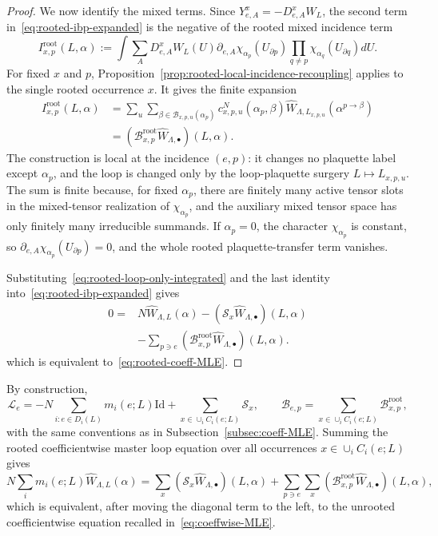 \documentclass[11pt,a4paper,reqno]{amsart}
\theoremstyle{definition}
\theoremstyle{remark}
\newcommand\Id{{\mathrm{Id}}}
\begin{document}
\begin{proof}
We now identify the mixed terms.  Since $Y^x_{e,A}=-D^x_{e,A}W_L$, the second term in~\eqref{eq:rooted-ibp-expanded} is the negative of the rooted mixed incidence term
\[
I^{\mathrm{root}}_{x,p}(L,\alpha)
:=
\int
\sum_A
D^x_{e,A}W_L(U) 
\partial_{e,A}\chi_{\alpha_p}(U_{\partial p})
\prod_{q\neq p}\chi_{\alpha_q}(U_{\partial q}) dU.
\]
For fixed $x$ and $p$, Proposition~\ref{prop:rooted-local-incidence-recoupling} applies to the single rooted occurrence $x$.  It gives the finite expansion
\begin{align*}
I^{\mathrm{root}}_{x,p}(L,\alpha)
&=
\sum_u\sum_{\beta\in\mathcal B_{x,p,u}(\alpha_p)}
c^N_{x,p,u}(\alpha_p,\beta)
\widehat W_{\Lambda,L_{x,p,u}}(\alpha^{p\to\beta})\\
&=(\mathscr B^{\mathrm{root}}_{x,p}\widehat W_{\Lambda,\bullet})(L,\alpha).
\end{align*}
The construction is local at the incidence $(e,p)$: it changes no plaquette label except $\alpha_p$, and the loop is changed only by the loop-plaquette surgery $L\mapsto L_{x,p,u}$.  The sum is finite because, for fixed $\alpha_p$, there are finitely many active tensor slots in the mixed-tensor realization of $\chi_{\alpha_p}$, and the auxiliary mixed tensor space has only finitely many irreducible summands.  If $\alpha_p=0$, the character $\chi_{\alpha_p}$ is constant, so $\partial_{e,A}\chi_{\alpha_p}(U_{\partial p})=0$, and the whole rooted plaquette-transfer term vanishes.

Substituting~\eqref{eq:rooted-loop-only-integrated} and the last identity into~\eqref{eq:rooted-ibp-expanded} gives
\[
\begin{aligned}
0={}&N\widehat W_{\Lambda,L}(\alpha)
-(\mathscr S_x\widehat W_{\Lambda,\bullet})(L,\alpha)\\
&-\sum_{p\ni e}
(\mathscr B^{\mathrm{root}}_{x,p}\widehat W_{\Lambda,\bullet})(L,\alpha).
\end{aligned}
\]
which is equivalent to~\eqref{eq:rooted-coeff-MLE}.
\end{proof}

By construction,
\[
\mathscr L_e=-N\sum_{i:e\in D_i(L)}m_i(e;L) \Id+
\sum_{x\in\cup_i C_i(e;L)}\mathscr S_x,
\qquad
\mathscr B_{e,p}=
\sum_{x\in\cup_i C_i(e;L)}\mathscr B^{\mathrm{root}}_{x,p},
\]
with the same conventions as in Subsection~\ref{subsec:coeff-MLE}. Summing the rooted coefficientwise master loop equation over all occurrences $x\in\cup_i C_i(e;L)$ gives
\[
N\sum_i m_i(e;L)\widehat W_{\Lambda,L}(\alpha)
=
\sum_x(\mathscr S_x\widehat W_{\Lambda,\bullet})(L,\alpha)
+
\sum_{p\ni e}\sum_x
(\mathscr B^{\mathrm{root}}_{x,p}\widehat W_{\Lambda,\bullet})(L,\alpha),
\]
which is equivalent, after moving the diagonal term to the left, to the unrooted coefficientwise equation recalled in~\eqref{eq:coeffwise-MLE}.
\end{document}
